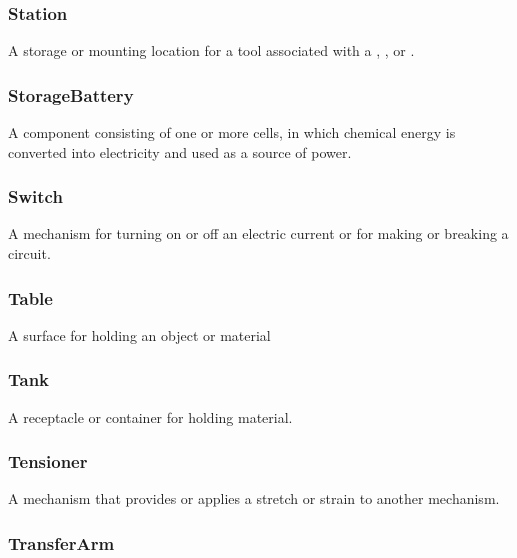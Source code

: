 \subsubsection{Station}
\label{sec:Station}



A storage or mounting location for a tool associated with a , , or .


\subsubsection{StorageBattery}
\label{sec:StorageBattery}



A component consisting of one or more cells, in which chemical energy is converted into electricity and used as a source of power. 


\subsubsection{Switch}
\label{sec:Switch}



A mechanism for turning on or off an electric current or for making or breaking a circuit.


\subsubsection{Table}




A surface for holding an object or material


\subsubsection{Tank}
\label{sec:Tank}



A receptacle or container for holding material.


\subsubsection{Tensioner}
\label{sec:Tensioner}



A mechanism that provides or applies a stretch or strain to another mechanism.


\subsubsection{TransferArm}
\label{sec:TransferArm}



